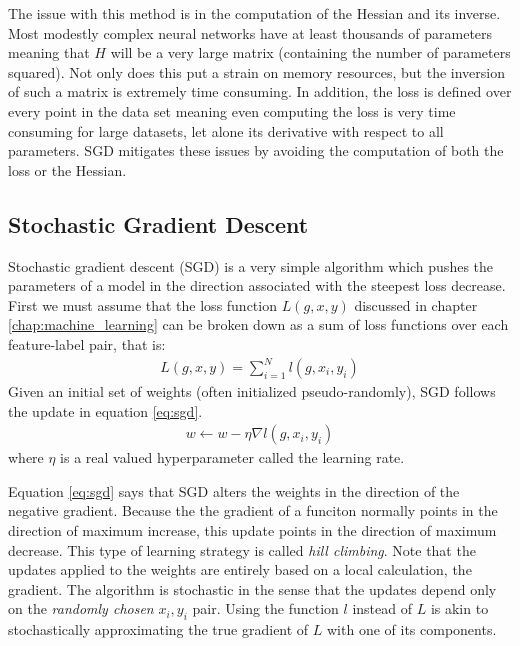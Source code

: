 The issue with this method is in the computation of the Hessian and its inverse.  Most modestly complex neural networks have at least thousands of parameters meaning that $H$ will be a very large matrix (containing the number of parameters squared).  Not only does this put a strain on memory resources, but the inversion of such a matrix is extremely time consuming.  In addition, the loss is defined over every point in the data set meaning even computing the loss is very time consuming for large datasets, let alone its derivative with respect to all parameters.  SGD mitigates these issues by avoiding the computation of both the loss or the Hessian.

\subsection{Stochastic Gradient Descent}\label{sec:sgd}
Stochastic gradient descent (SGD) is a very simple algorithm which pushes the parameters of a model in the direction associated with the steepest loss decrease.  First we must assume that the loss function $L(g,x,y)$ discussed in chapter \ref{chap:machine_learning} can be broken down as a sum of loss functions over each feature-label pair, that is:
\begin{align}
L(g,x,y) = \sum_{i=1}^N l(g,x_i,y_i)
\end{align}
Given an initial set of weights (often initialized pseudo-randomly), SGD follows the update in equation \ref{eq:sgd}.
\begin{align}\label{eq:sgd}
w \leftarrow w - \eta\nabla l(g,x_i,y_i)
\end{align}
where $\eta$ is a real valued hyperparameter called the learning rate.

Equation \ref{eq:sgd} says that SGD alters the weights in the direction of the negative gradient.  Because the the gradient of a funciton normally points in the direction of maximum increase, this update points in the direction of maximum decrease.  This type of learning strategy is called \textit{hill climbing}.  Note that the updates applied to the weights are entirely based on a local calculation, the gradient.  The algorithm is stochastic in the sense that the updates depend only on the \textit{randomly chosen} $x_i,y_i$ pair.  Using the function $l$ instead of $L$ is akin to stochastically approximating the true gradient of $L$ with one of its components.  

